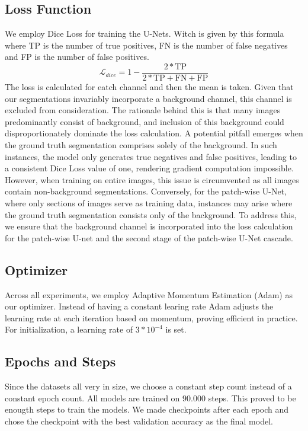 \subsection{Loss Function}
We employ Dice Loss for training the U-Nets. Witch is given by this formula where TP is the number of true positives, FN is the number of false negatives and FP is the number of false positives.
$$\mathcal{L}_{dice}=1-\frac{2*\text{TP}}{2*\text{TP}+\text{FN}+\text{FP}}$$
The loss is calculated for eatch channel and then the mean is taken.
Given that our segmentations invariably incorporate a background channel, this channel is excluded from consideration.
The rationale behind this is that many images predominantly consist of background, and inclusion of this background could disproportionately dominate the loss calculation.
A potential pitfall emerges when the ground truth segmentation comprises solely of the background. In such instances, the model only generates true negatives and false positives,
leading to a consistent Dice Loss value of one, rendering gradient computation impossible. However, when training on entire images,
this issue is circumvented as all images contain non-background segmentations. Conversely, for the patch-wise U-Net, where only sections of images serve as training data,
instances may arise where the ground truth segmentation consists only of the background. To address this,
we ensure that the background channel is incorporated into the loss calculation for the patch-wise U-net and the second stage of the patch-wise U-Net cascade.

\subsection{Optimizer}
Across all experiments, we employ Adaptive Momentum Estimation (Adam)\cite{kingma_adam_2017} as our optimizer.
Instead of having a constant learing rate Adam adjusts the learning rate at each iteration based on momentum, proving efficient in practice. For initialization,
a learning rate of $3*10^{-4}$ is set.

\subsection{Epochs and Steps}
Since the datasets all very in size, we choose a constant step count instead of a constant epoch count. All models are trained on $90.000$ steps. This proved to be enougth steps to train the models.
We made checkpoints after each epoch and chose the checkpoint with the best validation accuracy as the final model.


